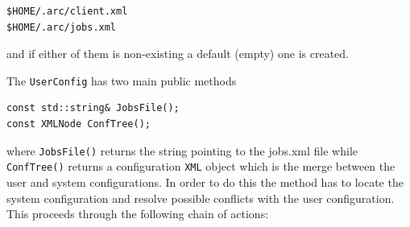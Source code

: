 \documentclass{book}
\newcommand{\UserConfig}{\texttt{UserConfig}}
\newcommand{\XML}{\texttt{XML}}
\begin{document}
\begin{shaded}
\begin{verbatim}                                                                                                                            
$HOME/.arc/client.xml
$HOME/.arc/jobs.xml
\end{verbatim}
\end{shaded}

and if either of them is non-existing a default (empty) one is created.

The {\UserConfig} has two main public methods

\begin{shaded}
\begin{verbatim}
const std::string& JobsFile();
const XMLNode ConfTree();
\end{verbatim}
\end{shaded}

where \texttt{JobsFile()} returns the string pointing to the jobs.xml file while \texttt{ConfTree()}
returns a configuration {\XML} object which is the merge between the user and system configurations.
In order to do this the method has to locate the system configuration and resolve possible conflicts 
with the user configuration. This proceeds through the following chain of actions:
\end{document}
